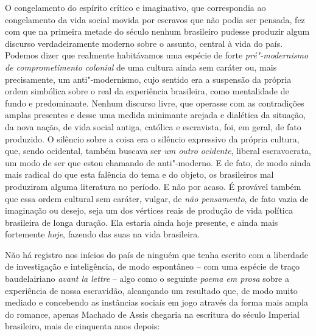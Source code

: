 O congelamento do espírito crítico e imaginativo, que correspondia ao
congelamento da vida social movida por escravos que não podia ser
pensada, fez com que na primeira metade do século  nenhum brasileiro
pudesse produzir algum discurso verdadeiramente moderno sobre o assunto,
central à vida do país. Podemos dizer que realmente habitávamos uma
espécie de forte \emph{pré"-modernismo de comprometimento colonial} de uma cultura ainda sem caráter ou, mais precisamente,
um anti"-modernismo, cujo sentido era a suspensão da própria ordem
simbólica sobre o real da experiência brasileira, como mentalidade de
fundo e predominante. Nenhum discurso livre, que operasse com as
contradições amplas presentes e desse uma medida minimante arejada e
dialética da situação, da nova nação, de vida social antiga, católica e
escravista, foi, em geral, de fato produzido. O silêncio sobre a coisa
era o silêncio expressivo da própria cultura, que, sendo ocidental,
também buscava ser \emph{um outro ocidente}, liberal escravocrata, um
modo de ser que estou chamando de anti"-moderno. E de fato, de modo ainda
mais radical do que esta falência do tema e do objeto, os brasileiros
mal produziram alguma literatura no período. E não por acaso. É provável
também que essa ordem cultural sem caráter, vulgar, de \emph{não
pensamento}, de fato vazia de imaginação ou desejo, seja um dos vértices
reais de produção de vida política brasileira de longa duração. Ela
estaria ainda hoje presente, e ainda mais fortemente \emph{hoje},
fazendo das suas na vida brasileira.

Não há registro nos inícios do país de ninguém que tenha escrito com a
liberdade de investigação e inteligência, de modo espontâneo -- com uma
espécie de traço baudelairiano \emph{avant la lettre} -- algo como o
seguinte \emph{poema em prosa} sobre a experiência de nossa escravidão,
alcançando um resultado que, de modo muito mediado e concebendo as
instâncias sociais em jogo através da forma mais ampla do romance,
apenas Machado de Assis chegaria na escritura do século Imperial
brasileiro, mais de cinquenta anos depois:


